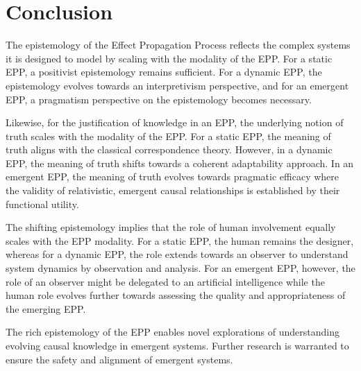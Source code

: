 \documentclass{article}
\begin{document}
\newpage

\section{Conclusion}
\label{sec:Conclusion}


The epistemology of the Effect Propagation Process reflects the complex systems it is designed to model by scaling with the modality of the EPP. For a static EPP, a positivist epistemology remains sufficient. For a dynamic EPP, the epistemology evolves towards an interpretivism perspective, and for an emergent EPP, a pragmatism perspective on the epistemology becomes necessary.

Likewise, for the justification of knowledge in an EPP, the underlying notion of truth scales with the modality of the EPP. For a static EPP, the meaning of truth aligns with the classical correspondence theory. However, in a dynamic EPP, the meaning of truth shifts towards a coherent adaptability approach. In an emergent EPP, the meaning of truth evolves towards pragmatic efficacy where the validity of relativistic, emergent causal relationships is established by their functional utility.

The shifting epistemology implies that the role of human involvement equally scales with the EPP modality. For a static EPP, the human remains the designer, whereas for a dynamic EPP, the role extends towards an observer to understand system dynamics by observation and analysis. For an emergent EPP, however, the role of an observer might be delegated to an artificial intelligence while the human role evolves further towards assessing the quality and appropriateness of the emerging EPP.

The rich epistemology of the EPP enables novel explorations of understanding evolving causal knowledge in emergent systems. Further research is warranted to ensure the safety and alignment of emergent systems.
 
  
  
\end{document}
